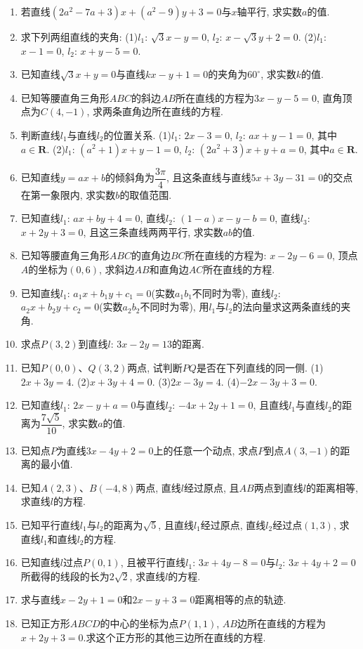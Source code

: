 \documentclass[10pt,a4paper]{article}
\begin{document}
\begin{enumerate}[1.]
\item 若直线$(2a^2-7a+3)x+(a^2-9)y+3=0$与$x$轴平行, 求实数$a$的值.
\item 求下列两组直线的夹角:
(1)$l_1$: $\sqrt 3x-y=0$, $l_2$: $x-\sqrt 3y+2=0$.
(2)$l_1$: $x-1=0$, $l_2$: $x+y-5=0$.
\item 已知直线$\sqrt 3x+y=0$与直线$kx-y+1=0$的夹角为$60^{\circ }$, 求实数$k$的值.
\item 已知等腰直角三角形$ABC$的斜边$AB$所在直线的方程为$3x-y-5=0$, 直角顶点为$C(4,-1)$, 求两条直角边所在直线的方程.
\item 判断直线$l_1$与直线$l_2$的位置关系.
(1)$l_1$: $2x-3=0$, $l_2$: $ax+y-1=0$, 其中$a\in \mathbf{R}$.
(2)$l_1$: $(a^2+1)x+y-1=0$, $l_2$: $(2a^2+3)x+y+a=0$, 其中$a\in \mathbf{R}$.
\item 已知直线$y=ax+b$的倾斜角为$\dfrac{3\pi }4$, 且这条直线与直线$5x+3y-31=0$的交点在第一象限内, 求实数$b$的取值范围.
\item 已知直线$l_1$: $ax+by+4=0$, 直线$l_2$: $(1-a)x-y-b=0$, 直线$l_3$: $x+2y+3=0$, 且这三条直线两两平行, 求实数$ab$的值.
\item 已知等腰直角三角形$ABC$的直角边$BC$所在直线的方程为: $x-2y-6=0$, 顶点$A$的坐标为$(0,6)$, 求斜边$AB$和直角边$AC$所在直线的方程.
\item 已知直线$l_1$: $a_1x+b_1y+c_1=0$(实数$a_1b_1$不同时为零), 直线$l_2$: $a_2x+b_2y+c_2=0$(实数$a_2b_2$不同时为零), 用$l_1$与$l_2$的法向量求这两条直线的夹角.
\item 求点$P(3,2)$到直线$l$: $3x-2y=13$的距离.
\item 已知$P(0,0)$、$Q(3,2)$两点, 试判断$PQ$是否在下列直线的同一侧.
(1)$2x+3y=4$.						(2)$x+3y+4=0$.
(3)$2x-3y=4$.						(4)$-2x-3y+3=0$.
\item 已知直线$l_1$: $2x-y+a=0$与直线$l_2$: $-4x+2y+1=0$, 且直线$l_1$与直线$l_2$的距离为$\dfrac{7\sqrt 5}{10}$, 求实数$a$的值.
\item 已知点$P$为直线$3x-4y+2=0$上的任意一个动点, 求点$P$到点$A(3,-1)$的距离的最小值.
\item 已知$A(2,3)$、$B(-4,8)$两点, 直线$l$经过原点, 且$AB$两点到直线$l$的距离相等, 求直线$l$的方程.
\item 已知平行直线$l_1$与$l_2$的距离为$\sqrt 5$, 且直线$l_1$经过原点, 直线$l_2$经过点$(1,3)$, 求直线$l_1$和直线$l_2$的方程.
\item 已知直线$l$过点$P(0,1)$, 且被平行直线$l_1$: $3x+4y-8=0$与$l_2$: $3x+4y+2=0$所截得的线段的长为$2\sqrt 2$, 求直线$l$的方程.
\item 求与直线$x-2y+1=0$和$2x-y+3=0$距离相等的点的轨迹.
\item 已知正方形$ABCD$的中心的坐标为点$P(1,1)$, $AB$边所在直线的方程为$x+2y+3=0$.求这个正方形的其他三边所在直线的方程.

\end{enumerate}
\end{document}

